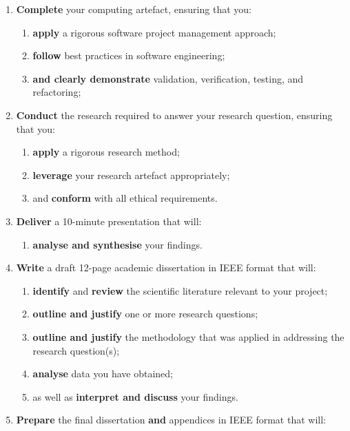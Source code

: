 \begin{enumerate}[label=(\Alph*)]
	\item \textbf{Complete} your computing artefact, ensuring that you:
		\begin{enumerate}[label=(\roman*)]
			\item \textbf{apply} a rigorous software project management approach;
			\item \textbf{follow} best practices in software engineering;
			\item \textbf{and clearly demonstrate} validation, verification, testing, and refactoring;
		\end{enumerate}
	\item \textbf{Conduct} the research required to answer your research question,
		ensuring that you:
		\begin{enumerate}[label=(\roman*)]
			\item \textbf{apply} a rigorous research method;
			\item \textbf{leverage} your research artefact appropriately;
			\item and \textbf{conform} with all ethical requirements.
		\end{enumerate}
	\item \textbf{Deliver} a 10-minute presentation that will:
		\begin{enumerate}[label=(\roman*)]
			\item \textbf{analyse and synthesise} your findings.
		\end{enumerate}
	\item \textbf{Write} a draft 12-page academic dissertation in IEEE format
		that will:
		\begin{enumerate}[label=(\roman*)]
			\item \textbf{identify} and \textbf{review} the scientific literature relevant to your project;
			\item \textbf{outline and justify} one or more research questions;
			\item \textbf{outline and justify} the methodology that was applied in addressing the research question(s);
			\item \textbf{analyse} data you have obtained;
			\item as well as \textbf{interpret and discuss} your findings.
		\end{enumerate}
	\item \textbf{Prepare} the final dissertation \textbf{and} appendices in IEEE format that will:
		\begin{enumerate}[label=(\roman*)]

\end{enumerate}
\end{enumerate}
